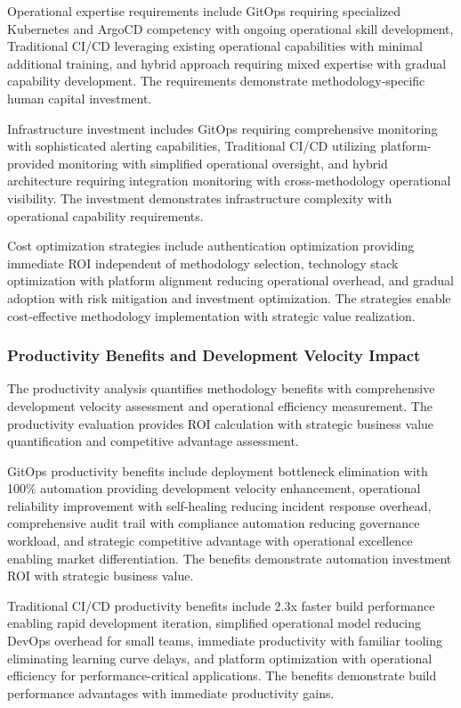 Operational expertise requirements include GitOps requiring specialized Kubernetes and ArgoCD competency with ongoing operational skill development, Traditional CI/CD leveraging existing operational capabilities with minimal additional training, and hybrid approach requiring mixed expertise with gradual capability development. The requirements demonstrate methodology-specific human capital investment.

Infrastructure investment includes GitOps requiring comprehensive monitoring with sophisticated alerting capabilities, Traditional CI/CD utilizing platform-provided monitoring with simplified operational oversight, and hybrid architecture requiring integration monitoring with cross-methodology operational visibility. The investment demonstrates infrastructure complexity with operational capability requirements.

Cost optimization strategies include authentication optimization providing immediate ROI independent of methodology selection, technology stack optimization with platform alignment reducing operational overhead, and gradual adoption with risk mitigation and investment optimization. The strategies enable cost-effective methodology implementation with strategic value realization.

\subsubsection{Productivity Benefits and Development Velocity Impact}

The productivity analysis quantifies methodology benefits with comprehensive development velocity assessment and operational efficiency measurement. The productivity evaluation provides ROI calculation with strategic business value quantification and competitive advantage assessment.

GitOps productivity benefits include deployment bottleneck elimination with 100\% automation providing development velocity enhancement, operational reliability improvement with self-healing reducing incident response overhead, comprehensive audit trail with compliance automation reducing governance workload, and strategic competitive advantage with operational excellence enabling market differentiation. The benefits demonstrate automation investment ROI with strategic business value.

Traditional CI/CD productivity benefits include 2.3x faster build performance enabling rapid development iteration, simplified operational model reducing DevOps overhead for small teams, immediate productivity with familiar tooling eliminating learning curve delays, and platform optimization with operational efficiency for performance-critical applications. The benefits demonstrate build performance advantages with immediate productivity gains.

